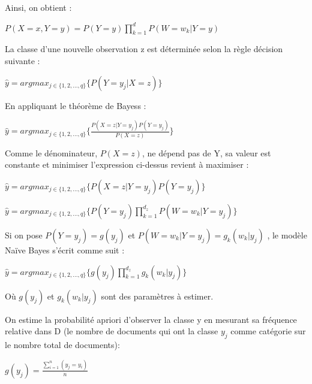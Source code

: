 \documentclass{article}
\begin{document}
Ainsi, on obtient :
\newline

\begin{center}
$P(X=x,Y=y)=P(Y=y)\prod_{k=1}^d P(W=w_k|Y=y)$
\end{center}


La classe d'une nouvelle observation z est déterminée selon la règle décision suivante :
\newline

\begin{center}
$\hat{y} = argmax_{j \in \{1,2,...,q\}}\{P(Y=y_j|X=z)\}$
\end{center}


En appliquant le théorème de Bayess :
\newline

\begin{center}
$\hat{y} = argmax_{j \in \{1,2,...,q\}}\{\frac{P(X=z|Y=y_j)P(Y=y_j)}{P(X=z)}\}$
\end{center}


Comme le dénominateur, $P(X=z)$, ne dépend pas de Y, sa valeur est constante et minimiser l'expression ci-dessus revient à maximiser :
\newline


\begin{center}
\item $\hat{y} = argmax_{j \in \{1,2,...,q\}}\{P(X=z|Y=y_j)P(Y=y_j)\}$
\item $\hat{y} = argmax_{j \in \{1,2,...,q\}}\{P(Y=y_j)\prod_{k=1}^{d_z} P(W=w_k|Y=y_j)\}$
\end{center}



Si on pose $P(Y=y_j)=g(y_j)$ et $P(W=w_k|Y=y_j)=g_k(w_k|y_j)$ , le modèle Naïve Bayes s'écrit comme suit :
\newline

\begin{center}
$\hat{y} = argmax_{j \in \{1,2,...,q\}}\{g(y_j)\prod_{k=1}^{d_z} g_k(w_k|y_j)\}$
\end{center}

Où $g(y_j)$ et $g_k(w_k|y_j)$ sont des paramètres à estimer.
\newline

On estime la probabilité apriori d'observer la classe y en mesurant sa fréquence relative dans D (le nombre de documents qui ont la classe $y_j$ comme catégorie sur le nombre total de documents):
\newline

\begin{center}
$g(y_j)=\frac{\sum_{i=1}^n (y_j=y_i)}{n}$
\end{center}
\end{document}
